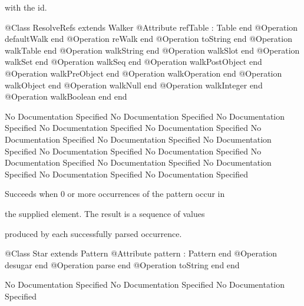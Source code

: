       with the id.
\begin{Interface}
@Class ResolveRefs extends Walker
  @Attribute refTable : Table end
  @Operation defaultWalk end
  @Operation reWalk end
  @Operation toString end
  @Operation walkTable end
  @Operation walkString end
  @Operation walkSlot end
  @Operation walkSet end
  @Operation walkSeq end
  @Operation walkPostObject end
  @Operation walkPreObject end
  @Operation walkOperation end
  @Operation walkObject end
  @Operation walkNull end
  @Operation walkInteger end
  @Operation walkBoolean end
end
\end{Interface}
No Documentation Specified
No Documentation Specified
No Documentation Specified
No Documentation Specified
No Documentation Specified
No Documentation Specified
No Documentation Specified
No Documentation Specified
No Documentation Specified
No Documentation Specified
No Documentation Specified
No Documentation Specified
No Documentation Specified
No Documentation Specified
No Documentation Specified

      Succeeds when 0 or more occurrences of the pattern occur in

      the supplied element. The result is a sequence of values

      produced by each successfully parsed occurrence.
\begin{Interface}
@Class Star extends Pattern
  @Attribute pattern : Pattern end
  @Operation desugar end
  @Operation parse end
  @Operation toString end
end
\end{Interface}
No Documentation Specified
No Documentation Specified
No Documentation Specified

